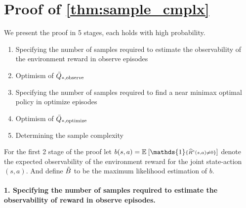 \section{Proof of \cref{thm:sample_cmplx}}
\label{appendix:proof_sample_cmplx}
We present the proof in 5 stages, each holds with high probability.
\begin{enumerate}
    \item Specifying the number of samples required to estimate the observability of the environment reward in observe episodes
    \item Optimism of $\bar{Q}_{*, \text{observe}}$
    \item Specifying the number of samples required to find a near minimax optimal policy in optimize episodes
    \item Optimism of $\bar{Q}_{*, \text{optimize}}$
    \item Determining the sample complexity
\end{enumerate}
%
For the first 2 stage of the proof let $b(s, a) = \EV{\mathds{1}\scriptstyle{\{\env{\widehat{R}}(s, a) \neq 0\}}}{}$ denote the expected observability of the environment reward for the joint state-action $(s, a)$. And define $\tilde{B}$ to be the maximum likelihood estimation of $b$.
%
\paragraph{1. Specifying the number of samples required to estimate the observability of reward in observe episodes.}

